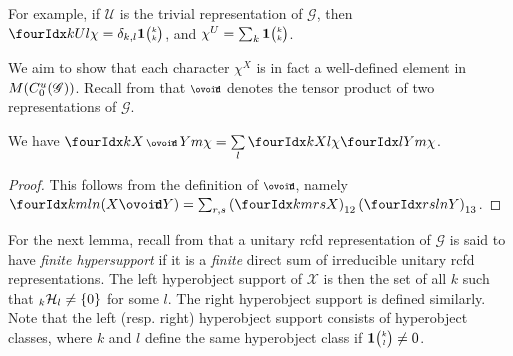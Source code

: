  For example, if $\mathscr{U}$ is the trivial representation of $\mathscr{G}$, then $\Gr{\chi}{}{U}{k}{l} = \delta_{k,l}\UnitC{k}{k}$, and $\chi^U = \sum_k \mathbf{1}{\tiny {\begin{pmatrix} k\\k\end{pmatrix}}}$.
 
 We aim to show that each character $\chi^X$ is in fact a well-defined element in $M(C^{u}_{0}(\mathscr{G}))$. Recall from \cite{DCT1} that $\smCirct$ denotes the tensor product of two representations of $\mathscr{G}$. 
 
 \begin{Lem} \label{LemCharMult} We have $\Gr{\chi}{}{X\smCirct Y}{k}{m}= \underset{l}{\sum}\, \Gr{\chi}{}{X}{k}{l}\Gr{\chi}{}{Y}{l}{m}$.
 \end{Lem}
 
 \begin{proof} 
 This follows from the definition of $\smCirct$, namely $\Gr{(X\Circt Y)}{k}{l}{m}{n} = \sum_{r,s} \left(\Gr{X}{k}{r}{m}{s}\right)_{12} \left(\Gr{Y}{r}{l}{s}{n}\right)_{13}$.
 \end{proof}

For the next lemma, recall from \cite{DCT1} that a unitary rcfd representation of $\mathscr{G}$ is said to have \emph{finite hypersupport} if it is a \emph{finite} direct sum of irreducible unitary rcfd representations.  The left hyperobject support of $\mathscr{X}$ is then the set of all $k$ such that ${}_{k}\mathcal{H}_{l}\neq \{0\}$ for some $l$. The right hyperobject support is defined similarly. Note that the left (resp. right) hyperobject support consists of  hyperobject classes, where $k$ and $l$ define the same hyperobject class if $\mathbf{1}{\tiny {\begin{pmatrix} k\\l\end{pmatrix}}}\neq0$. 


